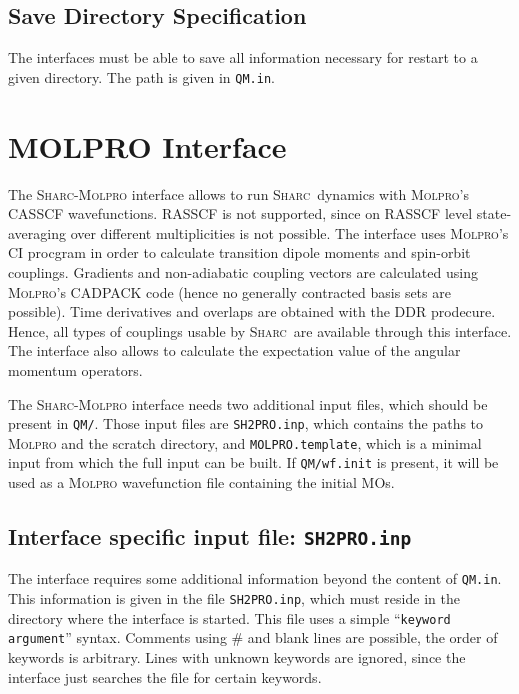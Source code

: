 \documentclass[a4paper,11pt,DIV=15,openany,twoside=false]{scrbook}
\newcommand{\sharc}{\textsc{Sharc}}
\newcommand{\ttt}[1]{\texttt{#1}}
\begin{document}
\subsection{Save Directory Specification}

The interfaces must be able to save all information necessary for restart to a given directory. The path is given in \ttt{QM.in}. 


\clearpage
\section{MOLPRO Interface}\label{sec:int:molpro}

The \sharc-\textsc{Molpro} interface allows to run \sharc\ dynamics with \textsc{Molpro}'s CASSCF wavefunctions. RASSCF is not supported, since on RASSCF level state-averaging over different multiplicities is not possible. The interface uses \textsc{Molpro}'s CI procgram in order to calculate transition dipole moments and spin-orbit couplings. Gradients and non-adiabatic coupling vectors are calculated using \textsc{Molpro}'s CADPACK code (hence no generally contracted basis sets are possible). Time derivatives and overlaps are obtained with the DDR prodecure. Hence, all types of couplings usable by \sharc\ are available through this interface. The interface also allows to calculate the expectation value of the angular momentum operators.

The \sharc-\textsc{Molpro} interface needs two additional input files, which should be present in \ttt{QM/}. Those input files are \ttt{SH2PRO.inp}, which contains the paths to \textsc{Molpro} and the scratch directory, and \ttt{MOLPRO.template}, which is a minimal input from which the full input can be built. If \ttt{QM/wf.init} is present, it will be used as a \textsc{Molpro} wavefunction file containing the initial MOs.

\subsection{Interface specific input file: \ttt{SH2PRO.inp}}

The interface requires some additional information beyond the content of \ttt{QM.in}. This information is given in the file \ttt{SH2PRO.inp}, which must reside in the directory where the interface is started. This file uses a simple ``\ttt{keyword argument}'' syntax. Comments using \# and blank lines are possible, the order of keywords is arbitrary. Lines with unknown keywords are ignored, since the interface just searches the file for certain keywords.
\end{document}
